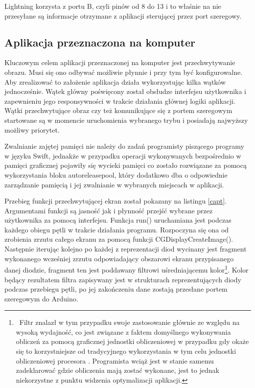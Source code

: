 \documentclass[12pt]{report}
\begin{document}
Lightning korzysta z portu B, czyli pinów od 8 do 13 i to właśnie na nie przesyłane są informacje otrzymane z aplikacji sterującej przez port szeregowy.

\subsection{Aplikacja przeznaczona na komputer}

Kluczowym celem aplikacji przeznaczonej na komputer jest przechwytywanie obrazu. Musi się ono odbywać możliwie płynnie i przy tym być konfigurowalne. Aby zrealizować to założenie aplikacja działa wykorzystując kilka wątków jednocześnie. Wątek główny poświęcony został obsłudze interfejsu użytkownika i zapewnieniu jego responsywności w trakcie działania głównej logiki aplikacji. Wątki przechwytujące obraz czy też komunikujące się z portem szeregowym startowane są w momencie uruchomienia wybranego trybu i posiadają najwyższy możliwy priorytet.

Zwalnianie zajętej pamięci nie należy do zadań programisty piszącego programy w języku Swift, jednakże w przypadku operacji wykonywanych bezpośrednio w pamięci graficznej pojawiły się wycieki pamięci co zostało rozwiązane za pomocą wykorzystania bloku autoreleasepool{}, który dodatkowo dba o odpowiednie zarządzanie pamięcią i jej zwalnianie w wybranych miejscach w aplikacji.

 \label{capt}

Przebieg funkcji przechwytującej ekran został pokazany na listingu \ref{capt}. Argumentami funkcji są jasność jak i płynność przejść wybrane przez użytkownika za pomocą interfejsu. Funkcja run() uruchamiana jest podczas każdego obiegu pętli w trakcie działania programu. Rozpoczyna się ona od zrobienia zrzutu całego ekranu za pomocą funkcji CGDisplayCreateImage(). Następnie iterując kolejno po każdej z reprezentacji diod wycinany jest fragment wykonanego wcześniej zrzutu odpowiadający obszarowi ekranu przypisanego danej diodzie, fragment ten jest poddawany filtrowi uśredniającemu kolor\footnote{~Filtr znalazł w tym przypadku swoje zastosowanie głównie ze względu na wysoką wydajność, co jest związane z faktem domyślnego wykonywania obliczeń za pomocą graficznej jednostki obliczeniowej w przypadku gdy okaże się to korzystniejsze od tradycyjnego wykorzystania w tym celu jednostki obliczeniowej procesora \cite{gpu}. Programista wciąż jest w stanie samemu zadeklarować gdzie obliczenia mają zostać wykonane, jest to jednak niekorzystne z punktu widzenia optymalizacji aplikacji.}. Kolor będący rezultatem filtra zapisywany jest w strukturach reprezentujących diody podczas przebiegu pętli, po jej zakończeniu dane zostają przesłane portem szeregowym do Arduino. 
\end{document}
